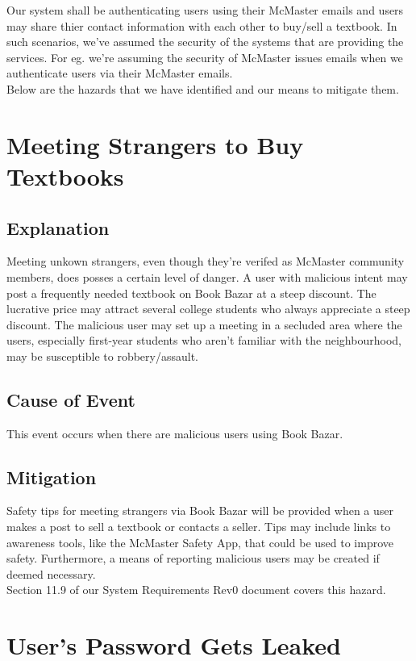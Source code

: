 \documentclass[fullpage]{article}
\begin{document}
Our system shall be authenticating users using their McMaster emails and users may share thier contact information with each other to buy/sell a textbook. In such scenarios, we've assumed the security of the systems that are providing the services. For eg. we're assuming the security of McMaster issues emails when we authenticate users via their McMaster emails.\\
\newline
Below are the hazards that we have identified and our means to mitigate them.

\section{Meeting Strangers to Buy Textbooks}
\subsection*{Explanation}
Meeting unkown strangers, even though they're verifed as McMaster community members, does posses a certain level of danger. A user with malicious intent may post a frequently needed textbook on Book Bazar at a steep discount. The lucrative price may attract several college students who always appreciate a steep discount. The malicious user may set up a meeting in a secluded area where the users, especially first-year students who aren't familiar with the neighbourhood, may be susceptible to robbery/assault.

\subsection*{Cause of Event}
This event occurs when there are malicious users using Book Bazar.

\subsection*{Mitigation}
Safety tips for meeting strangers via Book Bazar will be provided when a user makes a post to sell a textbook or contacts a seller. Tips may include links to awareness tools, like the McMaster Safety App, that could be used to improve safety. Furthermore, a means of reporting malicious users may be created if deemed necessary.\\
\newline
Section 11.9 of our System Requirements Rev0 document covers this hazard.

\section{User's Password Gets Leaked}
\end{document}
